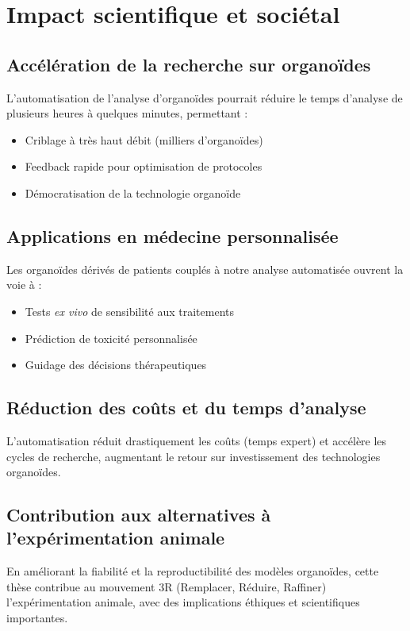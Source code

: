 \section{Impact scientifique et sociétal}

\subsection{Accélération de la recherche sur organoïdes}

L'automatisation de l'analyse d'organoïdes pourrait réduire le temps d'analyse de plusieurs heures à quelques minutes, permettant :
\begin{itemize}
    \item Criblage à très haut débit (milliers d'organoïdes)
    \item Feedback rapide pour optimisation de protocoles
    \item Démocratisation de la technologie organoïde
\end{itemize}

\subsection{Applications en médecine personnalisée}

Les organoïdes dérivés de patients couplés à notre analyse automatisée ouvrent la voie à :
\begin{itemize}
    \item Tests \textit{ex vivo} de sensibilité aux traitements
    \item Prédiction de toxicité personnalisée
    \item Guidage des décisions thérapeutiques
\end{itemize}

\subsection{Réduction des coûts et du temps d'analyse}

L'automatisation réduit drastiquement les coûts (temps expert) et accélère les cycles de recherche, augmentant le retour sur investissement des technologies organoïdes.

\subsection{Contribution aux alternatives à l'expérimentation animale}

En améliorant la fiabilité et la reproductibilité des modèles organoïdes, cette thèse contribue au mouvement 3R (Remplacer, Réduire, Raffiner) l'expérimentation animale, avec des implications éthiques et scientifiques importantes.

